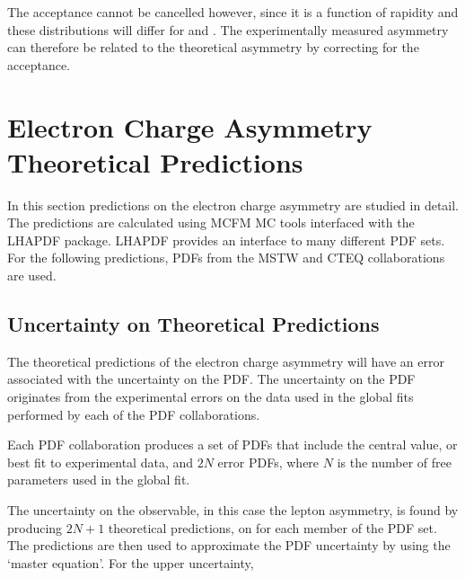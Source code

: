 The acceptance cannot be cancelled however, since it is a function of rapidity and 
these distributions will differ for \Pelectron and \APelectron.
The experimentally measured asymmetry can therefore be related to the
theoretical asymmetry by correcting for the acceptance.


\section{Electron Charge Asymmetry Theoretical Predictions}

In this section predictions on the electron charge asymmetry are studied in
detail.  The predictions are calculated using MCFM\cite{campbellmcfm} {MC} tools
interfaced with the LHAPDF package\cite{whalley2005houches}.  LHAPDF provides an
interface to many different {PDF} sets. For the following predictions, PDFs from
the MSTW \cite{martin2009parton} and CTEQ \cite{lai2010vv} collaborations are
used.

\subsection{Uncertainty on Theoretical Predictions}
The theoretical predictions of the electron charge asymmetry will have an error
associated with the uncertainty on the {PDF}.
The uncertainty on the {PDF} originates from the experimental errors on the
data used in the global fits performed by each of the {PDF} collaborations.

Each {PDF} collaboration produces a set of {PDFs} that include the
central value, or best fit to experimental data, and $2N$ error {PDFs}, where
$N$ is the number of free parameters used in the global
fit\cite{Bourilkov:2006cj}.

The uncertainty on the observable, in this case the lepton asymmetry, is found
by producing $2N+1$ theoretical predictions, on for each member of the {PDF}
set. The predictions are then used to approximate the {PDF} uncertainty by
using the `master equation'\cite{Bourilkov:2006cj,campbell2006hard}.
For the upper uncertainty,

